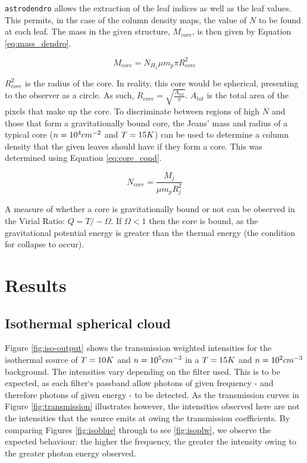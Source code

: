 \documentclass{report}
\begin{document}
\texttt{astrodendro} allows the extraction of the leaf indices as well as the leaf values. This permits, in the case of the column density maps, the value of $N$ to be found at each leaf. The mass in the given structure, $M_{core}$, is then given by Equation \ref{eq:mass_dendro}.

\begin{equation}
  M_{core} = N_{H_{2}}\mu m_{p} \pi R_{core}^{2}
\end{equation} \label{eq:mass_dendro}

$R_{core}^{2}$ is the radius of the core. In reality, this core would be spherical, presenting to the observer as a circle. As such, $R_{core} = \sqrt{\frac{A_{tot}}{\pi}}$. $A_{tot}$ is the total area of the pixels that make up the core. To discriminate between regions of high $N$ and those that form a gravitationally bound core, the Jeans' mass and radius of a typical core ($n = 10^{4}\/cm^{-2}$ and $T=15\/K$) can be used to determine a column density that the given leaves should have if they form a core. This was determined using Equation \ref{eq:core_cond}.

\begin{equation}
  N_{core} = \frac{M_{j}}{\mu m_{p} R_{j}^{2}}
\end{equation} \label{eq:core_cond}

A measure of whether a core is gravitationally bound or not can be observed in the Virial Ratio: $Q = T/-\Omega$. If $\Omega < 1$ then the core is bound, as the gravitational potential energy is greater than the thermal energy (the condition for collapse to occur).


\chapter{Results}

\section{Isothermal spherical cloud} \label{sec:iso}
Figure \ref{fig:iso-output} shows the transmission weighted intensities for the isothermal source of $T=10\/K$ and $n=10^{5}\/cm^{-3}$ in a $T=15\/K$ and $n=10^{2}\/cm^{-3}$ background. The intensities vary depending on the filter used. This is to be expected, as each filter`s passband allow photons of given frequency - and therefore photons of given energy - to be detected. As the transmission curves in Figure \ref{fig:transmission} illustrates however, the intensities observed here are not the intensities that the source emits at owing the transmission coefficients. By comparing Figures \ref{fig:isoblue} through to see \ref{fig:isoplw}, we observe the expected behaviour: the higher the frequency, the greater the intensity owing to the greater photon energy observed.
\end{document}

